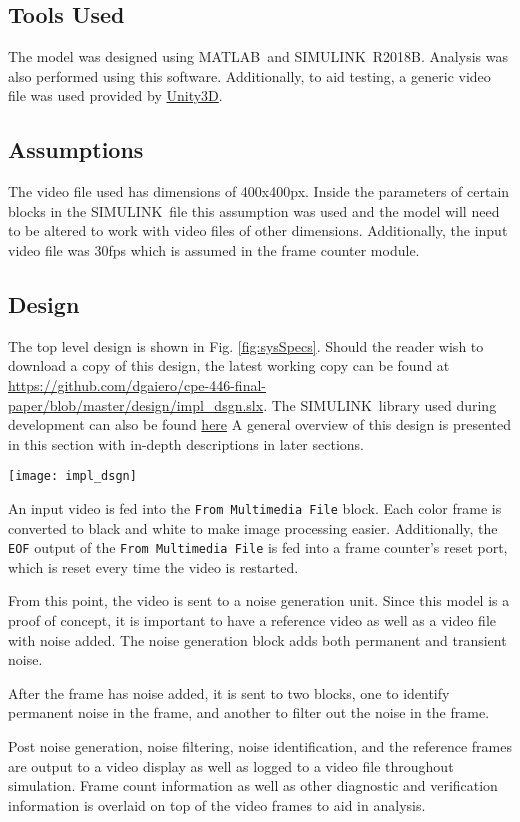 \subsection{Tools Used}
The model was designed using MATLAB\textregisteredmark\ and SIMULINK\textregisteredmark\ R2018B. Analysis was also performed using this software. Additionally, to aid testing, a generic video file was used provided by \hyperlink{https://blogs.unity3d.com/2016/11/28/free-vfx-image-sequences-flipbooks/}{Unity3D}.
\subsection{Assumptions}
The video file used has dimensions of 400x400px. Inside the parameters of certain blocks in the SIMULINK\textregisteredmark\ file this assumption was used and the model will need to be altered to work with video files of other dimensions. Additionally, the input video file was 30fps which is assumed in the frame counter module.
\subsection{Design}
The top level design is shown in Fig. \ref{fig:sysSpecs}. Should the reader wish to download a copy of this design, the latest working copy can be found at \hyperlink{https://github.com/dgaiero/cpe-446-final-paper/blob/master/design/impl_dsgn.slx}{https://github.com/dgaiero/cpe-446-final-paper/blob/master/design/impl\_dsgn.slx}. The SIMULINK\textregisteredmark\ library used during development can also be found \hyperlink{https://github.com/dgaiero/cpe-446-final-paper/blob/master/design/library.slx}{here} A general overview of this design is presented in this section with in-depth descriptions in later sections.
\begin{figure*}
    \texttt{[image: impl\_dsgn]}
    \caption{Top Level System Design}
    \label{fig:sysSpecs}
\end{figure*}
\par An input video is fed into the \verb!From Multimedia File! block. Each color frame is converted to black and white to make image processing easier. Additionally, the \verb!EOF! output of the \verb!From Multimedia File! is fed into a frame counter's reset port, which is reset every time the video is restarted.
\par From this point, the video is sent to a noise generation unit. Since this model is a proof of concept, it is important to have a reference video as well as a video file with noise added. The noise generation block adds both permanent and transient noise.
\par After the frame has noise added, it is sent to two blocks, one to identify permanent noise in the frame, and another to filter out the noise in the frame.
\par Post noise generation, noise filtering, noise identification, and the reference frames are output to a video display as well as logged to a video file throughout simulation. Frame count information as well as other diagnostic and verification information is overlaid on top of the video frames to aid in analysis.
